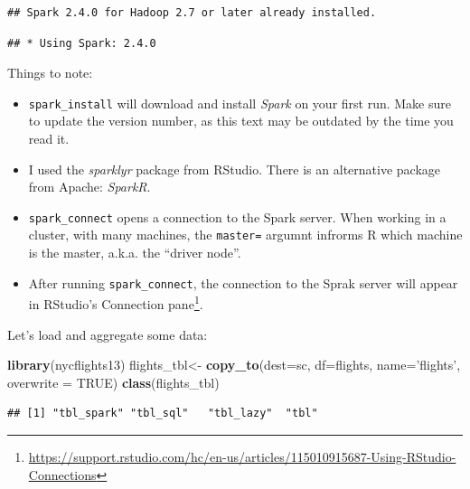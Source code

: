 \documentclass[]{book}
\newenvironment{Shaded}{\begin{snugshade}}{\end{snugshade}}
\newcommand{\DataTypeTok}[1]{\textcolor[rgb]{0.13,0.29,0.53}{#1}}
\newcommand{\KeywordTok}[1]{\textcolor[rgb]{0.13,0.29,0.53}{\textbf{#1}}}
\newcommand{\NormalTok}[1]{#1}
\newcommand{\OtherTok}[1]{\textcolor[rgb]{0.56,0.35,0.01}{#1}}
\newcommand{\StringTok}[1]{\textcolor[rgb]{0.31,0.60,0.02}{#1}}
\providecommand{\tightlist}{%
  \setlength{\itemsep}{0pt}\setlength{\parskip}{0pt}}
\renewcommand{\href}[2]{#2\footnote{\url{#1}}}
\theoremstyle{definition}
\theoremstyle{definition}
\theoremstyle{definition}
\theoremstyle{remark}
\begin{document}
\begin{verbatim}
## Spark 2.4.0 for Hadoop 2.7 or later already installed.
\end{verbatim}

\begin{verbatim}
## * Using Spark: 2.4.0
\end{verbatim}

Things to note:

\begin{itemize}
\tightlist
\item
  \texttt{spark\_install} will download and install \emph{Spark} on your first run. Make sure to update the version number, as this text may be outdated by the time you read it.
\item
  I used the \emph{sparklyr} package from RStudio. There is an alternative package from Apache: \emph{SparkR}.
\item
  \texttt{spark\_connect} opens a connection to the Spark server. When working in a cluster, with many machines, the \texttt{master=} argumnt infrorms R which machine is the master, a.k.a. the ``driver node''.
\item
  After running \texttt{spark\_connect}, the connection to the Sprak server will appear in RStudio's \href{https://support.rstudio.com/hc/en-us/articles/115010915687-Using-RStudio-Connections}{Connection pane}.
\end{itemize}

Let's load and aggregate some data:

\begin{Shaded}
\begin{Highlighting}[]
\KeywordTok{library}\NormalTok{(nycflights13)}
\NormalTok{flights_tbl<-}\StringTok{ }\KeywordTok{copy_to}\NormalTok{(}\DataTypeTok{dest=}\NormalTok{sc, }\DataTypeTok{df=}\NormalTok{flights, }\DataTypeTok{name=}\StringTok{'flights'}\NormalTok{, }\DataTypeTok{overwrite =} \OtherTok{TRUE}\NormalTok{)}
\KeywordTok{class}\NormalTok{(flights_tbl)}
\end{Highlighting}
\end{Shaded}

\begin{verbatim}
## [1] "tbl_spark" "tbl_sql"   "tbl_lazy"  "tbl"
\end{verbatim}
\end{document}

